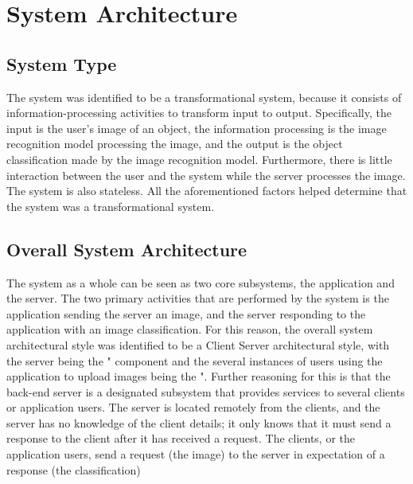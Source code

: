 \documentclass[a4paper, 11pt]{article}
\begin{document}
\pagebreak
\section{System Architecture}

\subsection{System Type}
The system was identified to be a transformational system, because it consists of information-processing activities to transform input to output. Specifically, the input is the user’s image of an object, the information processing is the image recognition model processing the image, and the output is the object classification made by the image recognition model. Furthermore, there is little interaction between the user and the system while the server processes the image. The system is also stateless. All the aforementioned factors helped determine that the system was a transformational system.

\subsection{Overall System Architecture}
The system as a whole can be seen as two core subsystems, the application
and the server. The two primary activities that are performed by the system is
the application sending the server an image, and the server responding to the
application with an image classification. For this reason, the overall system
architectural style was identified to be a Client Server architectural style, with
the server being the \Server" component and the several instances of users
using the application to upload images being the \Clients".
Further reasoning for this is that the back-end server is a designated
subsystem that provides services to several clients or application users. The
server is located remotely from the clients, and the server has no knowledge of
the client details; it only knows that it must send a response to the client after
it has received a request. The clients, or the application users, send a request
(the image) to the server in expectation of a response (the classification)
\end{document}
